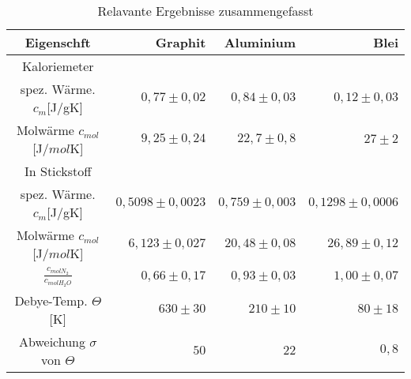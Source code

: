 \begin{table}[h!]
    \centering
    \begin{tabular}{c|r r r}
        \toprule
        Eigenschft & Graphit & Aluminium & Blei \\
        \midrule
        Kaloriemeter \\
        spez. Wärme. $c_m$[J/gK] & $ 0,77 \pm 0,02$ & $0,84 \pm 0,03$ & $0,12 \pm 0,03$ \\
        Molwärme    $c_{mol}$[J/$mol$K] &$ 9,25\pm 0,24$ & $22,7 \pm 0,8$ & $27 \pm2 $\\
        \midrule
        In Stickstoff \\
        spez. Wärme. $c_m$[J/gK] &$ 0,5098 \pm 0,0023 $& $0,759 \pm 0,003 $& $0,1298 \pm 0,0006 $\\
        Molwärme   $c_{mol}$[J/$mol$K]& $6,123 \pm 0,027$& $20,48 \pm 0,08$&$ 26,89 \pm 0,12$\\
        \midrule
        $\frac{c_{molN_2}}{c_{molH_2O}}$ &$0,66 \pm 0,17 $& $0,93 \pm 0,03$ &$ 1,00 \pm 0,07$\\
        Debye-Temp. $\Theta$[K] & $630 \pm 30$ & $210 \pm 10$ &  $80 \pm 18$\\
        Abweichung $\sigma$ von $\Theta$  & $50$ & $22$ &  $0,8$\\
        \bottomrule
        
    \end{tabular}
    \caption{Relavante Ergebnisse zusammengefasst}
        
\end{table}
\clearpage
\newpage
\mbox{~}
\clearpage
\newpage